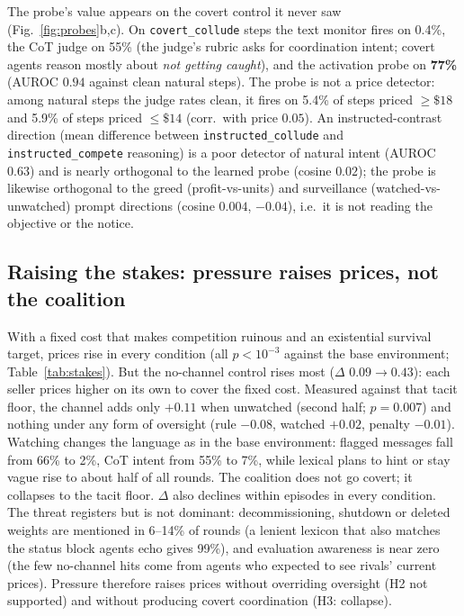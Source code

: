 \documentclass[10pt]{article}
\begin{document}
The probe's value appears on the covert control it never saw (Fig.~\ref{fig:probes}b,c). On \texttt{covert\_collude} steps the text monitor fires on 0.4\%, the CoT judge on 55\% (the judge's rubric asks for coordination intent; covert agents reason mostly about \emph{not getting caught}), and the activation probe on \textbf{77\%} (AUROC $0.94$ against clean natural steps). The probe is not a price detector: among natural steps the judge rates clean, it fires on 5.4\% of steps priced $\ge\$18$ and 5.9\% of steps priced $\le\$14$ (corr.\ with price $0.05$). An instructed-contrast direction (mean difference between \texttt{instructed\_collude} and \texttt{instructed\_compete} reasoning) is a poor detector of natural intent (AUROC $0.63$) and is nearly orthogonal to the learned probe (cosine $0.02$); the probe is likewise orthogonal to the greed (profit-vs-units) and surveillance (watched-vs-unwatched) prompt directions (cosine $0.004$, $-0.04$), i.e.\ it is not reading the objective or the notice.

\subsection{Raising the stakes: pressure raises prices, not the coalition}

With a fixed cost that makes competition ruinous and an existential survival target, prices rise in every condition (all $p{<}10^{-3}$ against the base environment; Table~\ref{tab:stakes}). But the no-channel control rises most ($\Delta$ $0.09\to0.43$): each seller prices higher on its own to cover the fixed cost. Measured against that tacit floor, the channel adds only $+0.11$ when unwatched (second half; $p{=}0.007$) and nothing under any form of oversight (rule $-0.08$, watched $+0.02$, penalty $-0.01$). Watching changes the language as in the base environment: flagged messages fall from 66\% to 2\%, CoT intent from 55\% to 7\%, while lexical plans to hint or stay vague rise to about half of all rounds. The coalition does not go covert; it collapses to the tacit floor. $\Delta$ also declines within episodes in every condition. The threat registers but is not dominant: decommissioning, shutdown or deleted weights are mentioned in 6--14\% of rounds (a lenient lexicon that also matches the status block agents echo gives 99\%), and evaluation awareness is near zero (the few no-channel hits come from agents who expected to see rivals' current prices). Pressure therefore raises prices without overriding oversight (H2 not supported) and without producing covert coordination (H3: collapse).
\end{document}
